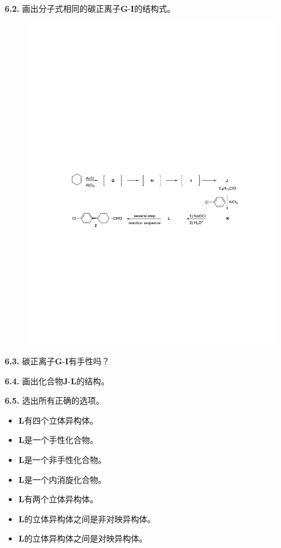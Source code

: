 \noindent\textbf{6.2.} 画出分子式相同的碳正离子\textbf{G}-\textbf{I}的结构式。

\begin{figure}[h]
	\centering
	\includegraphics[width=15cm]{./pic/t6-3.pdf}
\end{figure}

\noindent\textbf{6.3.} 碳正离子\textbf{G}-\textbf{I}有手性吗？

\noindent\textbf{6.4.} 画出化合物\textbf{J}-\textbf{L}的结构。

\noindent\textbf{6.5.} 选出所有正确的选项。

\renewcommand{\labelitemi}{$\square$}
\begin{itemize}
	\item \textbf{L}有四个立体异构体。
	\item \textbf{L}是一个手性化合物。
	\item \textbf{L}是一个非手性化合物。
	\item \textbf{L}是一个内消旋化合物。
	\item \textbf{L}有两个立体异构体。
	\item \textbf{L}的立体异构体之间是非对映异构体。
	\item \textbf{L}的立体异构体之间是对映异构体。
\end{itemize}
\renewcommand{\labelitemi}{$\bullet$}


